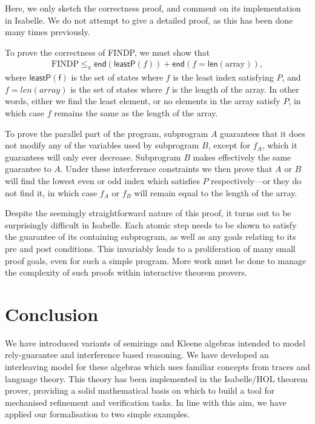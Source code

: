 \documentclass{llncs}
\newcommand{\edn}{\mathsf{end}}
\begin{document}
Here, we only sketch the correctness proof, and comment on its
implementation in Isabelle. We do not attempt to give a detailed
proof, as this has been done many times previously.

To prove the correctness of FINDP, we must show that
\begin{align*}
\text{FINDP} \le_\pi \edn(\mathsf{leastP}(f)) + \edn(f = \mathsf{len}(\text{array})),
\end{align*}
where $\mathsf{leastP(f)}$ is the set of states where $f$ is the least
index satisfying $P$, and $f = len(array)$ is the set of states where
$f$ is the length of the array. In other words, either we find the
least element, or no elements in the array satisfy $P$, in which case
$f$ remains the same as the length of the array.

To prove the parallel part of the program, subprogram $A$ guarantees
that it does not modify any of the variables used by subprogram $B$,
except for $f_A$, which it guarantees will only ever
decrease. Subprogram $B$ makes effectively the same guarantee to
$A$. Under these interference constraints we then prove that $A$ or
$B$ will find the lowest even or odd index which satisfies $P$
respectively---or they do not find it, in which case $f_A$ or $f_B$
will remain equal to the length of the array.

Despite the seemingly straightforward nature of this proof, it turns
out to be surprisingly difficult in Isabelle. Each atomic step
needs to be shown to satisfy the guarantee of its containing
subprogram, as well as any goals relating to its pre and post
conditions. This invariably leads to a proliferation of many small
proof goals, even for such a simple program. More work must be done
to manage the complexity of such proofs within interactive theorem
provers.

\section{Conclusion}

We have introduced variants of semirings and Kleene algebras intended
to model rely-guarantee and interference based reasoning. We have
developed an interleaving model for these algebras which uses familiar
concepts from traces and language theory. This theory has been
implemented in the Isabelle/HOL theorem prover, providing a solid
mathematical basis on which to build a tool for mechanised refinement
and verification tasks. In line with this aim, we have applied
our formalisation to two simple examples.
\end{document}
